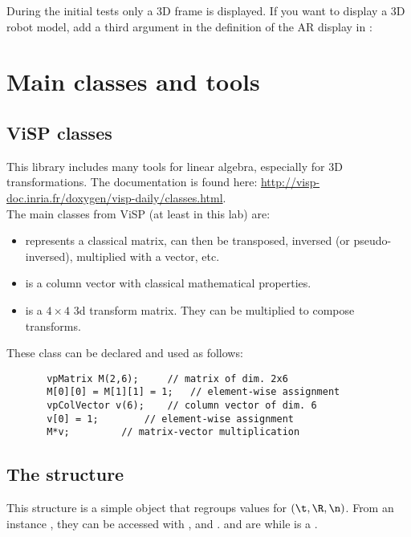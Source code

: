 \documentclass{ecnreport}
\begin{document}
During the initial tests only a 3D frame is displayed. If you want to display a 3D robot model, add a third argument in 
the definition of the AR display in :
\begin{center}
\end{center}


\appendix
\section{Main classes and tools}\label{sec:classes}

\subsection{ViSP classes}

This library includes many tools for linear algebra, especially for 3D transformations. 
The documentation is found here: \url{http://visp-doc.inria.fr/doxygen/visp-daily/classes.html}.\\
The main classes from ViSP (at least in this lab) are:
\begin{itemize}
\item {} represents a classical matrix, can then be transposed, inversed (or pseudo-inversed), multiplied with a vector, etc.
\item {} is a column vector with classical mathematical properties.
\item {} is a $4\times 4$ 3d transform matrix. They can be multiplied to compose transforms.
\end{itemize}
These class can be declared and used as follows:
\begin{center}\cppstyle
\begin{lstlisting}
       vpMatrix M(2,6); 	// matrix of dim. 2x6
       M[0][0] = M[1][1] = 1;	// element-wise assignment
       vpColVector v(6);	// column vector of dim. 6
       v[0] = 1;		// element-wise assignment
       M*v;			// matrix-vector multiplication
\end{lstlisting}
\end{center}

\subsection{The  structure}
\label{sec:homog}

This structure is a simple object that regroups values for $(\t,\R,\n)$. From an instance , they can be accessed with , 
 and .  and  are  while  is a .
\end{document}
